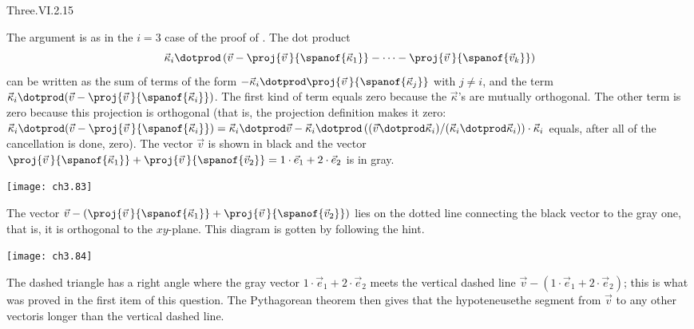 \begin{ans}{Three.VI.2.15}
       \begin{exparts}
         \partsitem The argument is as in the $i=3$ case of the proof
           of .
           The dot product
           \begin{equation*}
             \vec{\kappa}_i\dotprod
             \left(\vec{v}-\proj{\vec{v}\,}{\spanof{\vec{\kappa}_1}}
               -\dots-\proj{\vec{v}\,}{\spanof{\vec{v}_k}}\right)
           \end{equation*}
           can be written as the sum of terms of the form
           $-\vec{\kappa}_i\dotprod\proj{\vec{v}\,}{\spanof{\vec{\kappa}_j}}$
           with $j\neq i$,
           and the term
           $\vec{\kappa}_i\dotprod(\vec{v}-
                                 \proj{\vec{v}\,}{\spanof{\vec{\kappa}_i}})$.
           The first kind of term equals zero because the $\vec{\kappa}$'s
           are mutually orthogonal.
           The other term is zero because this projection is orthogonal
           (that is, the projection definition makes it zero:
           $\vec{\kappa}_i\dotprod(\vec{v}
               -\proj{\vec{v}\,}{\spanof{\vec{\kappa}_i}})
            =\vec{\kappa}_i\dotprod\vec{v}-
              \vec{\kappa}_i\dotprod
               \left((\vec{v}\dotprod\vec{\kappa}_i)/(%
                      \vec{\kappa}_i\dotprod\vec{\kappa}_i)\right)
                   \cdot\vec{\kappa}_i$
           equals, after all of the cancellation is done, zero).
         \partsitem The vector $\vec{v}$ is shown in black and the
           vector $\proj{\vec{v}\,}{\spanof{\vec{\kappa}_1}}
                    +\proj{\vec{v}\,}{\spanof{\vec{v}_2}}
                   =1\cdot\vec{e}_1+2\cdot\vec{e}_2$ is in gray.
           \begin{center}  \small
             \texttt{[image: ch3.83]}
              \end{center}
              The vector
              $\vec{v}-(\proj{\vec{v}\,}{\spanof{\vec{\kappa}_1}}
                    +\proj{\vec{v}\,}{\spanof{\vec{v}_2}})$
              lies on the dotted line connecting the black vector to the
              gray one, that is, it is orthogonal to the $xy$-plane.
          \partsitem This diagram is gotten by following the hint.
           \begin{center}  \small
             \texttt{[image: ch3.84]}
            \end{center}
            The dashed triangle has a right angle where
            the gray vector $1\cdot\vec{e}_1+2\cdot\vec{e}_2$
            meets the vertical dashed line
            $\vec{v}-(1\cdot\vec{e}_1+2\cdot\vec{e}_2)$; this is what was
            proved in the first item of this question.
            The Pythagorean theorem then gives that the hypoteneuse\Dash the
            segment from $\vec{v}$ to any other vector\Dash is longer than
            the vertical dashed line.


\end{exparts}
\end{ans}
